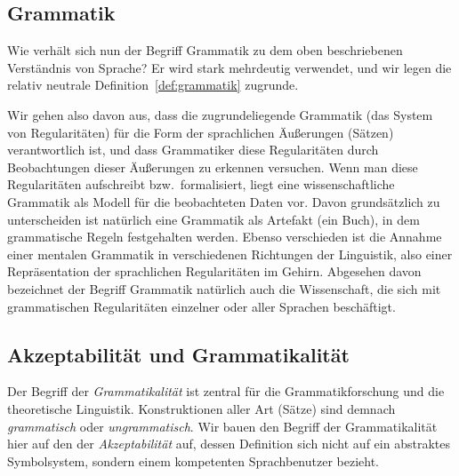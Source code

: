 \subsection{Grammatik}

\label{sec:grammatikbegriff}

Wie verhält sich nun der Begriff Grammatik zu dem oben beschriebenen Verständnis von Sprache?
Er wird stark mehrdeutig verwendet, und wir legen die relativ neutrale Definition~\ref{def:grammatik} zugrunde.


Wir gehen also davon aus, dass die zugrundeliegende Grammatik (das System von Regularitäten) für die Form der sprachlichen Äußerungen (\zB Sätzen) verantwortlich ist, und dass Grammatiker diese Regularitäten durch Beobachtungen dieser Äußerungen zu erkennen versuchen.
Wenn man diese Regularitäten aufschreibt bzw.\ formalisiert, liegt eine wissenschaftliche Grammatik als Modell für die beobachteten Daten vor.
Davon grundsätzlich zu unterscheiden ist natürlich eine Grammatik als Artefakt (\zB ein Buch), in dem grammatische Regeln festgehalten werden.
Ebenso verschieden ist die Annahme einer mentalen Grammatik in verschiedenen Richtungen der Linguistik, also einer Repräsentation der sprachlichen Regularitäten im Gehirn.
Abgesehen davon bezeichnet der Begriff Grammatik natürlich auch die Wissenschaft, die sich mit grammatischen Regularitäten einzelner oder aller Sprachen beschäftigt.

\subsection{Akzeptabilität und Grammatikalität}

\label{sec:grammungramm}
\label{sec:grammatikalitaet}


Der Begriff der \textit{Grammatikalität} ist zentral für die Grammatikforschung und die theoretische Linguistik.
Konstruktionen aller Art (\zB Sätze) sind demnach \textit{grammatisch} oder \textit{ungrammatisch}.
Wir bauen den Begriff der Grammatikalität hier auf den der \textit{Akzeptabilität} auf, dessen Definition sich nicht auf ein abstraktes Symbolsystem, sondern einem kompetenten Sprachbenutzer bezieht.

